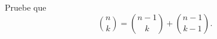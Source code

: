 \begin{statement}{12}
  Pruebe que
  \[
    \binom{n}{k} = \binom{n - 1}{k} + \binom{n - 1}{k - 1}.
  \]
\end{statement}